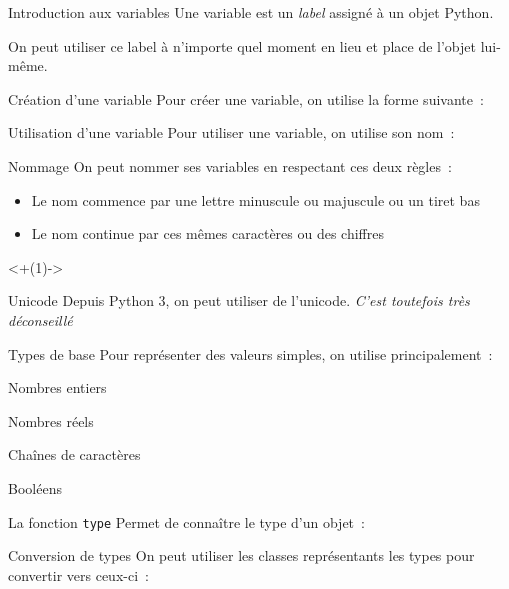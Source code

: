 \begin{frame}{Introduction aux variables}
  Une variable est un \emph{label} assigné à un objet Python.

  On peut utiliser ce label à n'importe quel moment en lieu et place de l'objet lui-même.
\end{frame}

\begin{frame}{Création d'une variable}
  Pour créer une variable, on utilise la forme suivante~:
\end{frame}

\begin{frame}{Utilisation d'une variable}
  Pour utiliser une variable, on utilise son nom~:
\end{frame}

\begin{frame}{Nommage}
  On peut nommer ses variables en respectant ces deux règles~:

  \begin{itemize}[<+(1)->]
    \item Le nom commence par une lettre minuscule ou majuscule ou un tiret bas
    \item Le nom continue par ces mêmes caractères ou des chiffres
  \end{itemize}

  \onslide<+(1)->{
    \begin{alertblock}{Unicode}
      Depuis Python 3, on peut utiliser de l'unicode. \emph{C'est toutefois très déconseillé}
    \end{alertblock}
  }
\end{frame}

\begin{frame}{Types de base}
  Pour représenter des valeurs simples, on utilise principalement~:

  \begin{description}[<+(1)->]
    \item[\texttt{int}] Nombres entiers
    \item[\texttt{float}] Nombres réels
    \item[\texttt{str}] Chaînes de caractères
    \item[\texttt{bool}] Booléens
  \end{description}
\end{frame}

\begin{frame}{La fonction \texttt{type}}
  Permet de connaître le type d'un objet~:

\end{frame}

\begin{frame}{Conversion de types}
  On peut utiliser les classes représentants les types pour convertir vers ceux-ci~:

\end{frame}

